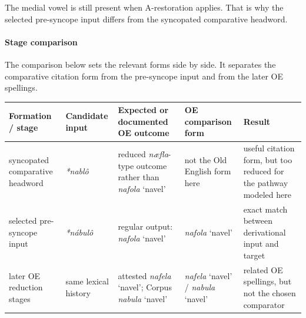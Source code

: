 \documentclass[
  british,
  a4paper,
]{article}
\newcounter{none} %
\begin{document}
The medial vowel is still present when A-restoration applies. That is
why the selected pre-syncope input differs from the syncopated
comparative headword.

\paragraph{Stage comparison}\label{stage-comparison}

The comparison below sets the relevant forms side by side. It separates
the comparative citation form from the pre-syncope input and from the
later OE spellings.

{\def\LTcaptype{none} %
\begin{longtable}[]{@{}
  >{\raggedright\arraybackslash}p{}
  >{\raggedright\arraybackslash}p{}
  >{\raggedright\arraybackslash}p{}
  >{\raggedright\arraybackslash}p{}
  >{\raggedright\arraybackslash}p{}@{}}
\toprule\noalign{}
\begin{minipage}[b]{\linewidth}\raggedright
Formation / stage
\end{minipage} & \begin{minipage}[b]{\linewidth}\raggedright
Candidate input
\end{minipage} & \begin{minipage}[b]{\linewidth}\raggedright
Expected or documented OE outcome
\end{minipage} & \begin{minipage}[b]{\linewidth}\raggedright
OE comparison form
\end{minipage} & \begin{minipage}[b]{\linewidth}\raggedright
Result
\end{minipage} \\
\midrule\noalign{}
\endhead
\bottomrule\noalign{}
\endlastfoot
syncopated comparative headword & {\emph{*nablô}} & reduced
\emph{næfla}-type outcome rather than {\emph{nafola}} `navel' & not the
Old English form here & useful citation form, but too reduced for the
pathway modeled here \\
selected pre-syncope input & {\emph{*nábulô}} & regular output:
{\emph{nafola}} `navel' & {\emph{nafola}} `navel' & exact match between
derivational input and target \\
later OE reduction stages & same lexical history & attested
{\emph{nafela}} `navel'; Corpus {\emph{nabula}} `navel' &
{\emph{nafela}} `navel' / {\emph{nabula}} `navel' & related OE
spellings, but not the chosen comparator \\
\end{longtable}
}
\end{document}
